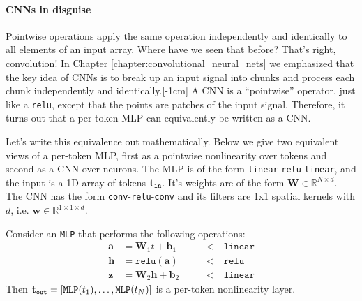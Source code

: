 

\paragraph*{CNNs in disguise} Pointwise operations apply the same operation independently and identically to all elements of an input array. Where have we seen that before? That's right, convolution! In Chapter \ref{chapter:convolutional_neural_nets} we emphasized that the key idea of CNNs is to break up an input signal into chunks and process each chunk independently and identically.[-1cm] 
A CNN is a ``pointwise'' operator, just like a \texttt{relu}, except that the points are patches of the input signal. Therefore, it turns out that a per-token MLP can equivalently be written as a CNN.

Let's write this equivalence out mathematically. Below we give two equivalent views of a per-token MLP, first as a pointwise nonlinearity over tokens and second as a CNN over neurons. The MLP is of the form \texttt{linear}-\texttt{relu}-\texttt{linear}, and the input is a 1D array of tokens $\mathbf{t}_{\texttt{in}}$. It's weights are of the form $\mathbf{W} \in \mathbb{R}^{N \times d}$. The CNN has the form \texttt{conv}-\texttt{relu}-\texttt{conv} and its filters are 1x1 spatial kernels with $d$, i.e. $\mathbf{w} \in \mathbb{R}^{1 \times 1 \times d}$.

Consider an \texttt{MLP} that performs the following operations:
\begin{align}
    \mathbf{a} &= \mathbf{W}_1t + \mathbf{b}_1 &\quad\quad \triangleleft \quad \texttt{linear}\\
    \mathbf{h} &= \texttt{relu}(\mathbf{a}) &\quad\quad \triangleleft \quad \texttt{relu}\\
    \mathbf{z} &= \mathbf{W}_2\mathbf{h} + \mathbf{b}_2 &\quad\quad \triangleleft \quad \texttt{linear}
\end{align}
Then $\mathbf{t}_{\texttt{out}} = [\texttt{MLP}(t_1), \ldots, \texttt{MLP}(t_N)]$ is a per-token nonlinearity layer.

